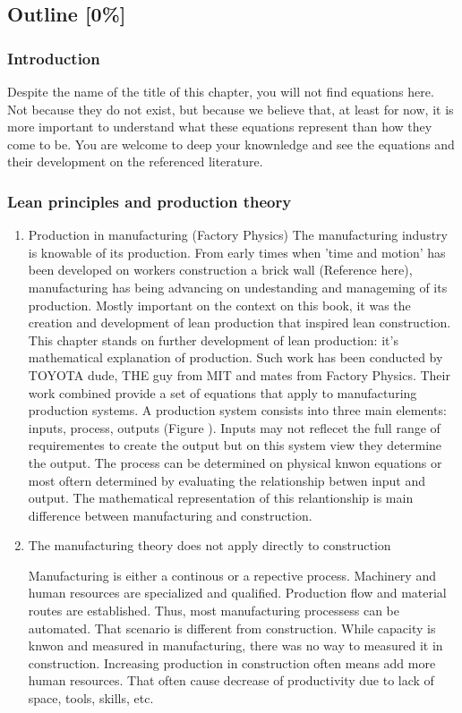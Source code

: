 \documentclass{article}
\begin{document}
\subsection{Outline [0\%]}
\label{sec:orgcc862eb}
\subsubsection{Introduction}
\label{sec:org518e880}
Despite the name of the title of this chapter, you will not find equations here.
Not because they do not exist, but because we believe that, at least for now, it is more important to understand what these equations represent than how they come to be.
You are welcome to deep your knownledge and see the equations and their development on the referenced literature.
\subsubsection{Lean principles and production theory}
\label{sec:org08eebe9}
\begin{enumerate}
\item Production in manufacturing (Factory Physics)
\label{sec:orgfb139a0}
The manufacturing industry is knowable of its production.
From early times when 'time and motion' has been developed on workers construction a brick wall (Reference here), manufacturing has being advancing on undestanding and manageming of its production.
Mostly important on the context on this book, it was the creation and development of lean production that inspired lean construction.
This chapter stands on further development of lean production: it's mathematical explanation of production.
Such work has been conducted by TOYOTA dude, THE guy from MIT and mates from Factory Physics.
Their work combined provide a set of equations that apply to manufacturing production systems.
A production system consists into three main elements: inputs, process, outputs (Figure ).
Inputs may not reflecet the full range of requirementes to create the output but on this system view they determine the output.
The process can be determined on physical knwon equations or most oftern determined by evaluating the relationship betwen input and output.
The mathematical representation of this relantionship is main difference between manufacturing and construction.

\item The manufacturing theory does not apply directly to construction
\label{sec:orgc3f21b7}

Manufacturing is either a continous or a repective process.
Machinery and human resources are specialized and qualified.
Production flow and material routes are established. 
Thus, most manufacturing processess can be automated.
That scenario is different from construction.
While capacity is knwon and measured in manufacturing, there was no way to measured it in construction.
Increasing production in construction often means add more human resources.
That often cause decrease of productivity due to lack of space, tools, skills, etc.
\end{enumerate}
\end{document}
